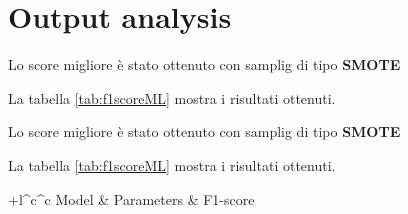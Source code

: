 \section{Output analysis}
        
        Lo score migliore è stato ottenuto con samplig di tipo \textbf{SMOTE}
        \bigbreak
        
        La tabella \ref{tab:f1scoreML} mostra i risultati ottenuti.
        

  		\begin{center}
	    	Lo score migliore è stato ottenuto con samplig di tipo \textbf{SMOTE}
	    	\bigbreak
	    	
	    	La tabella \ref{tab:f1scoreML} mostra i risultati ottenuti.
	    	\begin{tabular}{+l^c^c}
	    		\toprule\rowstyle{\bfseries}
	    		Model & Parameters & F1-score \\
	    		\toprule
	    		

\end{tabular}
\end{center}
